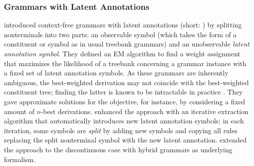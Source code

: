 \documentclass[../document.tex]{subfiles}
\begin{document}
    \subsubsection*{Grammars with Latent Annotations}
     introduced context-free grammars with latent annotations (short: ) by splitting nonterminals into two parts: an observable symbol (which takes the form of a constituent or  symbol as in usual treebank grammars) and an unobservable \emph{latent annotation symbol}.
    They defined an EM algorithm to find a weight assignment that maximizes the likelihood of a treebank concerning a grammar instance with a fixed set of latent annotation symbols.
    As these grammars are inherently ambiguous, the best-weighted derivation may not coincide with the best-weighted constituent tree; finding the latter is known to be intractable in practice \citep[they concluded that finding the best-weighted constituent tree is \emph{NP-hard} in Section~3]{Mat05}.
    They gave approximate solutions for the objective, for instance, by considering a fixed amount of \(n\)-best derivations.
     enhanced the approach with an iterative extraction algorithm that automatically introduces new latent annotation symbols; in each iteration, some symbols are \emph{split} by adding new symbols and copying all rules replacing the split nonterminal symbol with the new latent annotation.
     extended the approach to the discontinuous case with hybrid grammars as underlying formalism.
\end{document}
